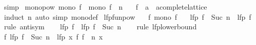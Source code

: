 \begin{isabellebody}
\ simp\isanewline
{}\isamarkupfalse%
%
\endisatagproof
{\isafoldproof}%
%
\isadelimproof
\isanewline
%
\endisadelimproof
\isanewline
{}\isamarkupfalse%
\ mono{\isacharunderscore}{\kern0pt}pow{\isacharcolon}{\kern0pt}\ {\isachardoublequoteopen}mono\ f\ {\isasymLongrightarrow}\ mono\ {\isacharparenleft}{\kern0pt}f\ {\isacharcircum}{\kern0pt}{\isacharcircum}{\kern0pt}\ n{\isacharparenright}{\kern0pt}{\isachardoublequoteclose}\isanewline
\ \ \ f\ {\isacharcolon}{\kern0pt}{\isacharcolon}{\kern0pt}\ {\isachardoublequoteopen}{\isacharprime}{\kern0pt}a\ {\isasymRightarrow}\ {\isacharprime}{\kern0pt}a{\isacharcolon}{\kern0pt}{\isacharcolon}{\kern0pt}complete{\isacharunderscore}{\kern0pt}lattice{\isachardoublequoteclose}\isanewline
%
\isadelimproof
\ \ %
\endisadelimproof
%
\isatagproof
{}\isamarkupfalse%
\ {\isacharparenleft}{\kern0pt}induct\ n{\isacharparenright}{\kern0pt}\ {\isacharparenleft}{\kern0pt}auto\ simp{\isacharcolon}{\kern0pt}\ mono{\isacharunderscore}{\kern0pt}def{\isacharparenright}{\kern0pt}%
\endisatagproof
{\isafoldproof}%
%
\isadelimproof
\isanewline
%
\endisadelimproof
\isanewline
{}\isamarkupfalse%
\ lfp{\isacharunderscore}{\kern0pt}funpow{\isacharcolon}{\kern0pt}\isanewline
\ \ \ f{\isacharcolon}{\kern0pt}\ {\isachardoublequoteopen}mono\ f{\isachardoublequoteclose}\isanewline
\ \ \ {\isachardoublequoteopen}lfp\ {\isacharparenleft}{\kern0pt}f\ {\isacharcircum}{\kern0pt}{\isacharcircum}{\kern0pt}\ Suc\ n{\isacharparenright}{\kern0pt}\ {\isacharequal}{\kern0pt}\ lfp\ f{\isachardoublequoteclose}\isanewline
%
\isadelimproof
%
\endisadelimproof
%
\isatagproof
{}\isamarkupfalse%
\ {\isacharparenleft}{\kern0pt}rule\ antisym{\isacharparenright}{\kern0pt}\isanewline
\ \ \isamarkupfalse%
\ {\isachardoublequoteopen}lfp\ f\ {\isasymle}\ lfp\ {\isacharparenleft}{\kern0pt}f\ {\isacharcircum}{\kern0pt}{\isacharcircum}{\kern0pt}\ Suc\ n{\isacharparenright}{\kern0pt}{\isachardoublequoteclose}\isanewline
\ \ \isamarkupfalse%
\ {\isacharparenleft}{\kern0pt}rule\ lfp{\isacharunderscore}{\kern0pt}lowerbound{\isacharparenright}{\kern0pt}\isanewline
\ \ \ \ \isamarkupfalse%
\ {\isachardoublequoteopen}f\ {\isacharparenleft}{\kern0pt}lfp\ {\isacharparenleft}{\kern0pt}f\ {\isacharcircum}{\kern0pt}{\isacharcircum}{\kern0pt}\ Suc\ n{\isacharparenright}{\kern0pt}{\isacharparenright}{\kern0pt}\ {\isacharequal}{\kern0pt}\ lfp\ {\isacharparenleft}{\kern0pt}{\isasymlambda}x{\isachardot}{\kern0pt}\ f\ {\isacharparenleft}{\kern0pt}{\isacharparenleft}{\kern0pt}f\ {\isacharcircum}{\kern0pt}{\isacharcircum}{\kern0pt}\ n{\isacharparenright}{\kern0pt}\ x{\isacharparenright}{\kern0pt}{\isacharparenright}{\kern0pt}{\isachardoublequoteclose}\isanewline

\end{isabellebody}
